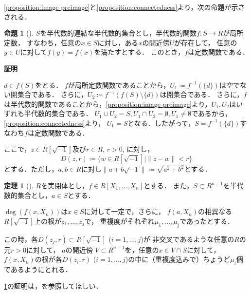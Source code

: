 \documentclass[uplatex, dvipdfmx]{jsarticle}
\makeatletter
\numberwithin{equation}{section}
\renewenvironment{proof}[1][\proofname]{\par
  \pushQED{\qed}%
  \normalfont \topsep6\p@\@plus6\p@\relax
  \trivlist
  \item\relax
  {\bfseries
  #1\@addpunct{.}}\hspace\labelsep\ignorespaces
}{
  \popQED\endtrivlist\@endpefalse
}
\newcommand{\map}[3]{{#1}\colon{#2}\rightarrow{#3}}
\newcommand{\norm}[1]{\| {#1} \|}
\theoremstyle{definition}
\newtheorem{proposition}[definition]{命題}
\newtheorem{theorem}[definition]{定理}
\renewcommand{\proofname}{\textbf{証明}}
\makeatother
\begin{document}
\cref{proposition:image-preimage}と\cref{proposition:connectedness}より，次の命題が示さされる．

\begin{proposition}[{\cite[Proposition 3.9.]{MR2248869}}]
     $S$を半代数的連結な半代数的集合とし，半代数的関数$\map{f}{S}{R}$が局所定数，
     すなわち，任意の$x \in S$に対し，ある$x$の開近傍$U$が存在して，
     任意の$y \in U$に対して$f(y)=f(x)$を満たすとする．
     このとき，$f$は定数関数である．
\end{proposition}
\begin{proof}
     $d \in f(S)$をとる．
     $f$が局所定数関数であることから，$U_1\coloneqq f^{-1}(\{d\})$は空でない開集合である．
     さらに，$U_2\coloneqq f^{-1}(f(S) \setminus \{d\})$は開集合である．
     さらに，$f$は半代数的関数であることから，\cref{proposition:image-preimage}より，$U_1, U_2$はいずれも半代数的集合である．
     $U_1 \cup U_2 = S, U_1 \cap U_2 = \emptyset, U_1 \neq \emptyset$であるから，\cref{proposition:connectedness}より，
     $U_1 = S$となる．したがって，$S = f^{-1}(\{d\})$すなわち$f$は定数関数である．
\end{proof}

ここで，$z \in R\left[ \sqrt{-1} \right]$及び$r \in R$, $r>0$, に対し，
\begin{equation}
     D(z, r)\coloneqq \{w \in R\left[\sqrt{-1}\right] \mid \norm{z - w} < r\}
\end{equation}
とする．ただし，$a,b \in R$に対し$\norm{a + b\sqrt{-1}} \coloneqq \sqrt{a^2 + b^2}$とする．

\begin{theorem}[{\cite[Theorem 5.12.]{MR2248869}}] \label{theorem:continuity-of-roots}
     $R$を実閉体とし，$f \in R[X_1, \dots, X_n]$とする．
     また，$S \subset R^{n-1}$を半代数的集合とし，$a \in S$とする．

     $\deg (f(x,X_n))$は$x \in S$に対して一定で，さらに，
     $f(a,X_n)$の相異なる$R\left[\sqrt{-1} \right]$上の根が$z_1, \dots, z_j$で，
     重複度がそれぞれ$\mu_1, \dots, \mu_j$であったとする．

     この時，各$D(z_j, r) \subset R\left[ \sqrt{-1} \right]$ ($i=1, \dots, j$)が
     非交叉であるような任意の$R$の元$r > 0$に対して，
     $a$の開近傍 $V \subset R^{n-1}$を，任意の$x \in V \cap S$に対して，
     $f(x, X_n)$の根が各$D(z_i, r)$ ($i=1, \dots, j$)の中に（重複度込みで）ちょうど$\mu_i$個であるようにとれる．
\end{theorem}

\cref{theorem:continuity-of-roots}の証明は，\cite[Theorem 5.12.]{MR2248869}を参照してほしい．
\end{document}
